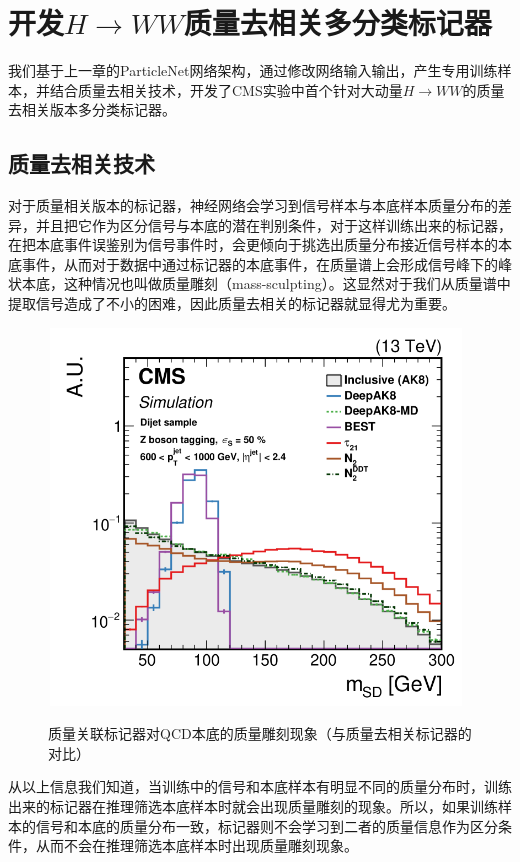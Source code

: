 \chapter{开发$H\to WW$质量去相关多分类标记器}
\label{chap5}
\fontsize{12bp}{14.4pt}
我们基于上一章的ParticleNet网络架构，通过修改网络输入输出，产生专用训练样本，并结合质量去相关技术，开发了CMS实验中首个针对大动量$H\to WW$的质量去相关版本多分类标记器。

\section{质量去相关技术}
对于质量相关版本的标记器，神经网络会学习到信号样本与本底样本质量分布的差异，并且把它作为区分信号与本底的潜在判别条件，对于这样训练出来的标记器，在把本底事件误鉴别为信号事件时，会更倾向于挑选出质量分布接近信号样本的本底事件，从而对于数据中通过标记器的本底事件，在质量谱上会形成信号峰下的峰状本底，这种情况也叫做质量雕刻（mass-sculpting）。这显然对于我们从质量谱中提取信号造成了不小的困难，因此质量去相关的标记器就显得尤为重要。

\begin{figure}[H]
 \centering
 \caption{质量关联标记器对QCD本底的质量雕刻现象（与质量去相关标记器的对比）\cite{jet-tagging-algorithms}}
 \includegraphics[height=10cm, width=11cm]{pictures/nonMDtagger.png}
 \label{fig:5.1}
\end{figure}

从以上信息我们知道，当训练中的信号和本底样本有明显不同的质量分布时，训练出来的标记器在推理筛选本底样本时就会出现质量雕刻的现象。所以，如果训练样本的信号和本底的质量分布一致，标记器则不会学习到二者的质量信息作为区分条件，从而不会在推理筛选本底样本时出现质量雕刻现象\cite{deepak8andmass-decorrelation}。

